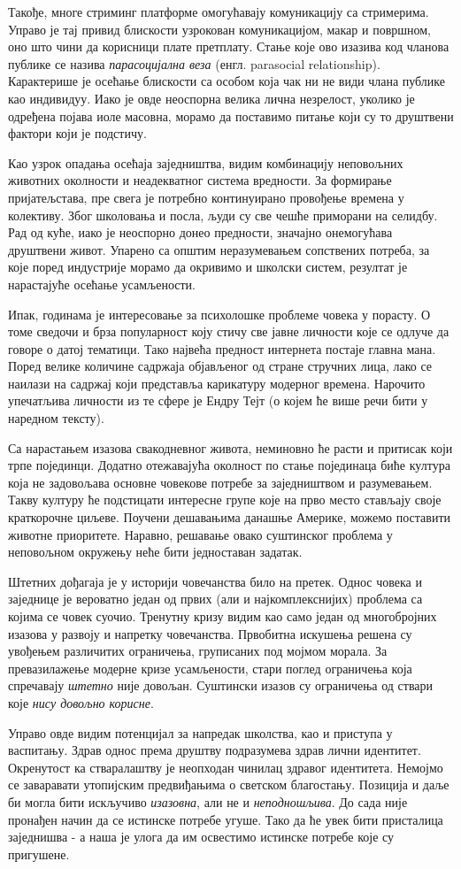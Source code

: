 \documentclass[b5paper]{article}
\begin{document}
Такође, многе стриминг платформе омогућавају комуникацију са стримерима. Управо је тај привид блискости узрокован комуникацијом, макар и површном, оно што чини да корисници плате претплату. Стање које ово изазива код чланова публике се назива \textit{парасоцијална веза} (енгл. parasocial relationship). Карактерише је осећање блискости са особом која чак ни не види члана публике као индивидуу. Иако је овде неоспорна велика лична незрелост, уколико је одређена појава иоле масовна, морамо да поставимо питање који су то друштвени фактори који је подстичу.

Као узрок опадања осећаја заједништва, видим комбинацију неповољних животних околности и неадекватног система вредности. За формирање пријатељстава, пре свега је потребно континуирано провођење времена у колективу. Због школовања и посла, људи су све чешће приморани на селидбу. Рад од куће, иако је неоспорно донео предности, значајно онемогућава друштвени живот. Упарено са општим неразумевањем сопствених потреба, за које поред индустрије морамо да окривимо и школски систем, резултат је нарастајуће осећање усамљености.

Ипак, годинама је интересовање за психолошке проблеме човека у порасту. О томе сведочи и брза популарност коју стичу све јавне личности које се одлуче да говоре о датој тематици. Тако највећа предност интернета постаје главна мана. Поред велике количине садржаја објављеног од стране стручних лица, лако се наилази на садржај који представља карикатуру модерног времена. Нарочито упечатљива личности из те сфере је Ендру Тејт (о којем ће више речи бити у наредном тексту).

Са нарастањем изазова свакодневног живота, неминовно ће расти и притисак који трпе појединци. Додатно отежавајућа околност по стање појединаца биће култура која не задовољава основне човекове потребе за заједништвом и разумевањем. Такву културу ће подстицати интересне групе које на прво место стављају своје краткорочне циљеве. Поучени дешавањима данашње Америке, можемо поставити животне приоритете. Наравно, решавање овако суштинског проблема у неповољном окружењу неће бити једноставан задатак.

Штетних дођагаја је у историји човечанства било на претек. Однос човека и заједнице је вероватно један од првих (али и најкомплекснијих) проблема са којима се човек суочио. Тренутну кризу видим као само један од многобројних изазова у развоју и напретку човечанства. Првобитна искушења решена су увођењем различитих ограничења, груписаних под мојмом морала. За превазилажење модерне кризе усамљености, стари поглед ограничења која спречавају \textit{штетно} није довољан. Суштински изазов су ограничења од ствари које \textit{нису довољно корисне}.

Управо овде видим потенцијал за напредак школства, као и приступа у васпитању. Здрав однос према друштву подразумева здрав лични идентитет. Окренутост ка стваралаштву је неопходан чинилац здравог идентитета. Немојмо се заваравати утопијским предвиђањима о светском благостању. Позиција и даље би могла бити искључиво \textit{изазовна}, али не и \textit{неподношљива}. До сада није пронађен начин да се истинске потребе угуше. Тако да ће увек бити присталица заједнишва - а наша је улога да им освестимо истинске потребе које су пригушене.
\end{document}
